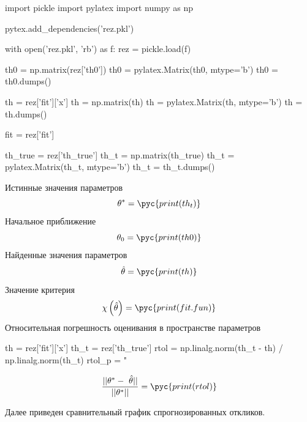 \documentclass[a4paper,14pt]{extarticle}
\begin{document}
\begin{pycode}
import pickle
import pylatex
import numpy as np

pytex.add_dependencies('rez.pkl')

with open('rez.pkl', 'rb') as f:
	rez = pickle.load(f)

th0 = np.matrix(rez['th0'])
th0 = pylatex.Matrix(th0, mtype='b')
th0 = th0.dumps()

th = rez['fit']['x']
th = np.matrix(th)
th = pylatex.Matrix(th, mtype='b')
th = th.dumps()

fit = rez['fit']

th_true = rez['th_true']
th_t = np.matrix(th_true)
th_t = pylatex.Matrix(th_t, mtype='b')
th_t = th_t.dumps()

\end{pycode}

\bigskip \noindent
Истинные значения параметров 
\[
	\theta^{*} = \pyc{print(th_t)}
\]
Начальное приближение 
\[
	\theta_{0} = \pyc{print(th0)}
\]
Найденные значения параметров
\[
	\hat{\theta} = \pyc{print(th)}
\]
Значение критерия
\[
	\chi\left(\hat{\theta}\right) = \pyc{print(fit.fun)}
\]
Относительная погрешность оценивания в пространстве параметров
\begin{pycode}
th = rez['fit']['x']
th_t = rez['th_true']
rtol = np.linalg.norm(th_t - th) / np.linalg.norm(th_t)
rtol_p = "%
\end{pycode}
\[
	\frac{||\theta^* -\ \hat{\theta}||}{||\theta^*||} = \pyc{print(rtol)}
\]

Далее приведен сравнительный график спрогнозированных откликов.

\end{document}
